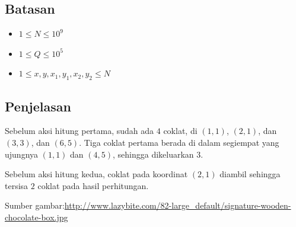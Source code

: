 \documentclass{article}
\begin{document}
\subsection*{Batasan}

\begin{itemize}
  \item $1 \leq N \leq 10^9$
  \item $1 \leq Q \leq 10^5$
  \item $1 \leq x, y, x_1, y_1, x_2, y_2 \leq N$
\end{itemize}

\subsection*{Penjelasan}

\par\noindent Sebelum aksi hitung pertama, sudah ada $4$ coklat, di $(1,1)$, $(2,1)$, dan $(3,3)$, dan $(6,5)$. Tiga coklat pertama berada di dalam segiempat yang ujungnya $(1,1)$ dan $(4,5)$, sehingga dikeluarkan $3$.

\par\noindent Sebelum aksi hitung kedua, coklat pada koordinat $(2,1)$ diambil sehingga tersisa $2$ coklat pada hasil perhitungan.

\par\noindent Sumber gambar:\url{http://www.lazybite.com/82-large_default/signature-wooden-chocolate-box.jpg}
\end{document}
